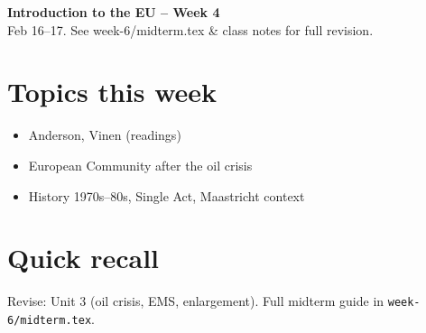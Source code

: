 \documentclass[10pt,a4paper]{article}
\begin{document}
\begin{center}
{\large\bfseries\color{eublue} Introduction to the EU -- Week 4}\\[0.2em]
\footnotesize Feb 16--17. See week-6/midterm.tex \& class notes for full revision.
\end{center}\vspace{0.5em}

\section*{\color{eublue}Topics this week}
\begin{itemize}
\item Anderson, Vinen (readings)
\item European Community after the oil crisis
\item History 1970s--80s, Single Act, Maastricht context
\end{itemize}

\section*{Quick recall}
Revise: Unit 3 (oil crisis, EMS, enlargement). Full midterm guide in \texttt{week-6/midterm.tex}.
\end{document}
